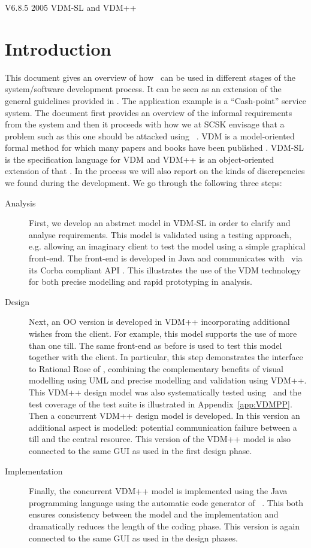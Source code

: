 \documentclass[\pformat,12pt,twoside]{article}
\newcommand{\vdmtoolsver}{V6.8.5}
\begin{document}
       {\vdmtoolsver}
       {2005}
       {VDM-SL and VDM++}

\section{Introduction}


This document gives an overview of how
\vdmtools\ can be used in
different stages of the system/software development process. It can be
seen as an extension of the general guidelines provided in
\cite{Guidelines}. The
application example is a ``Cash-point'' service system. The document
first provides an overview of the informal requirements from the
system and then it proceeds with how we at SCSK envisage that a
problem such as this one should be attacked using
\vdmtools\ \cite{Mukherjee95a,Elmstrom&94}. VDM is a
model-oriented formal method for which many papers and books have been
published \cite{Jones90a,Fitzgerald&98b}. VDM-SL is the specification
language for VDM \cite{ISOVDM96} and VDM++ is an object-oriented
extension of that \cite{LangManPP}.
In the process we will also report on the kinds of discrepencies we found
during the development. We go 
through the following three steps:


\begin{description}
\item[Analysis] First, we develop an abstract model in VDM-SL in 
order to clarify and analyse requirements. This model is validated 
using a testing approach, e.g. allowing an imaginary client to 
test the model using a simple graphical front-end. The front-end 
is developed in Java and communicates with \vdmtools\  
via its Corba compliant API \cite{OMG&96,APIMan}. This illustrates the use of the 
VDM technology for both precise modelling and rapid prototyping 
in analysis.
\item[Design] Next, an OO version is developed in VDM++ incorporating
additional wishes from the client. For example, this model supports
the use of more than one till. The same front-end as before is used to
test this model together with the client. In particular, this step
demonstrates the interface to Rational Rose \cite{Rose&00} of
\vdmtools, combining the complementary benefits of visual modelling
using UML and precise modelling and validation using VDM++. This VDM++
design model was also systematically tested using \vdmtools\ and the
test coverage of the test suite is illustrated in
Appendix~\ref{app:VDMPP}.  Then a concurrent VDM++ design model is
developed. In this version an additional aspect is modelled: potential
communication failure between a till and the central resource. This
version of the VDM++ model is also connected to the same GUI as used
in the first design phase.
\item[Implementation] Finally, the concurrent VDM++ model is
implemented using the Java programming language \cite{Gosling&00} using the automatic code
generator of \vdmtools\ \cite{CGJavaManPP}.  This both ensures
consistency between the model and the implementation and dramatically
reduces the length of the coding phase. This version is again
connected to the same GUI as used in the design phases.
\end{description}
\end{document}
